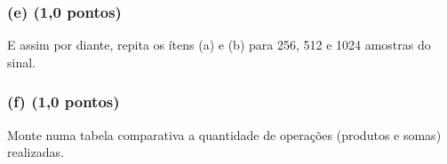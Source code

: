 \subsubsection*{(e) \textbf{(1,0 pontos)}}
E assim por diante, repita os ítens (a) e (b) para 256, 512 e 1024 amostras do sinal.

\subsubsection*{(f) \textbf{(1,0 pontos)}}
Monte numa tabela comparativa a quantidade de operações (produtos e somas) realizadas.
